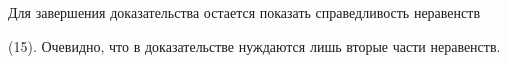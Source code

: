 




\vskip 2cm












\label{end}







































%










%







Для завершения доказательства остается показать справедливость неравенств


(15). Очевидно, что в доказательстве нуждаются лишь вторые части неравенств.


